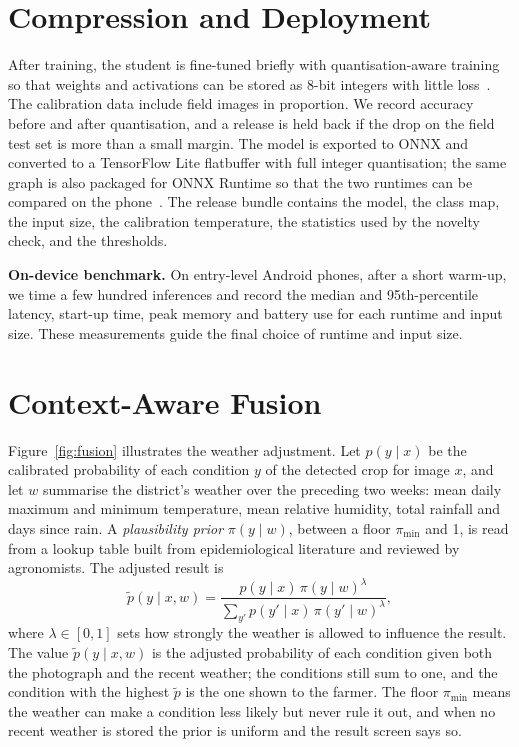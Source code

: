\section{Compression and Deployment}
\label{sec:deploy}
After training, the student is fine-tuned briefly with quantisation-aware training so that weights and activations can be stored as 8-bit integers with little loss~\cite{krishnamoorthi2018quant}. The calibration data include field images in proportion. We record accuracy before and after quantisation, and a release is held back if the drop on the field test set is more than a small margin. The model is exported to ONNX and converted to a TensorFlow Lite flatbuffer with full integer quantisation; the same graph is also packaged for ONNX Runtime so that the two runtimes can be compared on the phone~\cite{zhangq2022mobilebench}. The release bundle contains the model, the class map, the input size, the calibration temperature, the statistics used by the novelty check, and the thresholds.

\textbf{On-device benchmark.} On entry-level Android phones, after a short warm-up, we time a few hundred inferences and record the median and 95th-percentile latency, start-up time, peak memory and battery use for each runtime and input size. These measurements guide the final choice of runtime and input size.

\section{Context-Aware Fusion}
\label{sec:fusion}
Figure~\ref{fig:fusion} illustrates the weather adjustment. Let $p(y \mid x)$ be the calibrated probability of each condition $y$ of the detected crop for image $x$, and let $w$ summarise the district's weather over the preceding two weeks: mean daily maximum and minimum temperature, mean relative humidity, total rainfall and days since rain. A \emph{plausibility prior} $\pi(y \mid w)$, between a floor $\pi_{\min}$ and 1, is read from a lookup table built from epidemiological literature and reviewed by agronomists. The adjusted result is
\begin{equation}
\tilde{p}(y \mid x, w) = \frac{p(y \mid x)\, \pi(y \mid w)^{\lambda}}{\sum_{y'} p(y' \mid x)\, \pi(y' \mid w)^{\lambda}},
\label{eq:fusion}
\end{equation}
where $\lambda \in [0,1]$ sets how strongly the weather is allowed to influence the result. The value $\tilde{p}(y \mid x, w)$ is the adjusted probability of each condition given both the photograph and the recent weather; the conditions still sum to one, and the condition with the highest $\tilde{p}$ is the one shown to the farmer. The floor $\pi_{\min}$ means the weather can make a condition less likely but never rule it out, and when no recent weather is stored the prior is uniform and the result screen says so.

